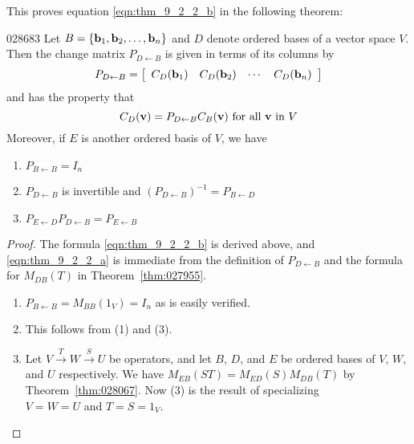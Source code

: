 \newpage
\noindent This proves equation \ref{eqn:thm_9_2_2_b} in the following theorem:

\begin{theorem}{}{028683}
Let $B = \{\textbf{b}_{1}, \textbf{b}_{2}, \dots, \textbf{b}_{n}\}$ and $D$ denote ordered bases of a vector space $V$. Then the change matrix $P_{D \gets B}$ is given in terms of its columns by
\begin{equation}\label{eqn:thm_9_2_2_a}
P_{D \gets B} = \left[ \begin{array}{cccc} C_D(\textbf{b}_1) & C_D(\textbf{b}_2) & \cdots & C_D(\textbf{b}_n) \end{array} \right]
\end{equation}
and has the property that
\begin{equation}\label{eqn:thm_9_2_2_b}
C_D(\textbf{v}) = P_{D \gets B}C_B(\textbf{v}) \mbox{ for all } \textbf{v} \mbox{ in } V
\end{equation}
Moreover, if $E$ is another ordered basis of $V$, we have
\begin{enumerate}
\item $P_{B \gets B} = I_{n}$

\item $P_{D \gets B}$ is invertible and $(P_{D \gets B})^{-1} = P_{B \gets D}$

\item $P_{E \gets D}P_{D \gets B} = P_{E \gets B}$

\end{enumerate}
\end{theorem}

\begin{proof}
The formula \ref{eqn:thm_9_2_2_b} is derived above, and \ref{eqn:thm_9_2_2_a} is immediate from the definition of $P_{D \gets B}$ and the formula for $M_{DB}(T)$ in Theorem~\ref{thm:027955}.
\begin{enumerate}
\item $P_{B \gets B} = M_{BB}(1_{V}) = I_{n}$ as is easily verified.

\item This follows from (1) and (3).

\item Let $V \stackrel{T}{\to} W \stackrel{S}{\to} U$ be operators, and let $B$, $D$, and $E$ be ordered bases of $V$, $W$, and $U$ respectively. We have $M_{EB}(ST) = M_{ED}(S)M_{DB}(T)$ by Theorem~\ref{thm:028067}. Now (3) is the result of specializing \\ $V = W = U$ and $T = S = 1_{V}$.
\end{enumerate}
\vspace*{-2em}\end{proof}

